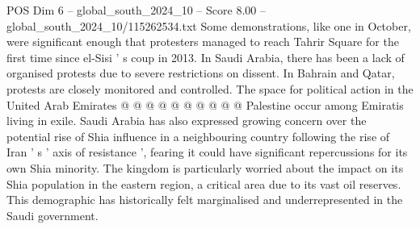 \begin{textsample}{POS Dim 6 – global\_south\_2024\_10 – Score 8.00 – global\_south\_2024\_10/115262534.txt}
Some demonstrations, like one in October, were significant enough that protesters managed to reach Tahrir Square for the first time since el-Sisi ' s coup in 2013.
In Saudi Arabia, there has been a lack of organised protests due to severe restrictions on dissent.
In Bahrain and Qatar, protests are closely monitored and controlled.
The space for political action in the United Arab Emirates @ @ @ @ @ @ @ @ @ @ Palestine occur among Emiratis living in exile.
Saudi Arabia has also expressed growing concern over the potential rise of Shia influence in a neighbouring country following the rise of Iran ' s ' axis of resistance ', fearing it could have significant repercussions for its own Shia minority.
The kingdom is particularly worried about the impact on its Shia population in the eastern region, a critical area due to its vast oil reserves.
This demographic has historically felt marginalised and underrepresented in the Saudi government.

\end{textsample}
